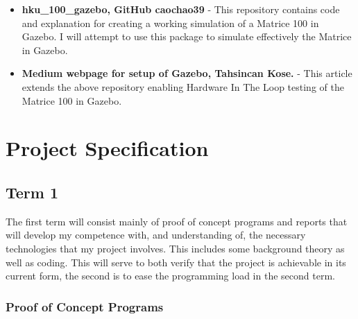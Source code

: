 \documentclass[]{../resources/final_report}
\begin{document}
\begin{itemize}
  \item \textbf{hku\_100\_gazebo, GitHub caochao39} \cite{caochao39} - This repository contains code and explanation for creating a working simulation of a Matrice 100 in Gazebo. I will attempt to use this package to simulate effectively the Matrice in Gazebo.
  \item \textbf{Medium webpage for setup of Gazebo, Tahsincan Kose.} \cite{kose_2019} - This article extends the above repository enabling Hardware In The Loop testing of the Matrice 100 in Gazebo.
\end{itemize}




\chapter{Project Specification}

\section{Term 1}

The first term will consist mainly of proof of concept programs and reports that will develop my competence with, and understanding of, the necessary technologies that my project involves. This includes some background theory as well as coding. This will serve to both verify that the project is achievable in its current form, the second is to ease the programming load in the second term.

\subsection{Proof of Concept Programs}
\end{document}
